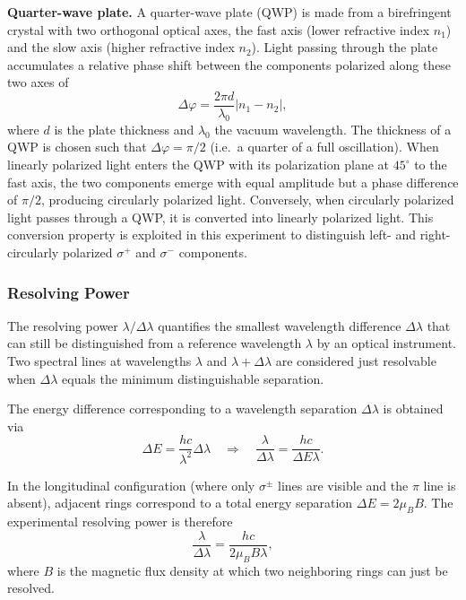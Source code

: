 \documentclass{article}
\begin{document}
\textbf{Quarter-wave plate.} A quarter-wave plate (QWP) is made from a birefringent crystal with two orthogonal optical axes, the fast axis (lower refractive index $n_1$) and the slow axis (higher refractive index $n_2$). Light passing through the plate accumulates a relative phase shift between the components polarized along these two axes of
\begin{equation}
    \Delta\varphi = \frac{2\pi d}{\lambda_0}|n_1 - n_2|,
\end{equation}
where $d$ is the plate thickness and $\lambda_0$ the vacuum wavelength. The thickness of a QWP is chosen such that $\Delta\varphi = \pi/2$ (i.e.\ a quarter of a full oscillation). When linearly polarized light enters the QWP with its polarization plane at $45^\circ$ to the fast axis, the two components emerge with equal amplitude but a phase difference of $\pi/2$, producing circularly polarized light. Conversely, when circularly polarized light passes through a QWP, it is converted into linearly polarized light. This conversion property is exploited in this experiment to distinguish left- and right-circularly polarized $\sigma^+$ and $\sigma^-$ components.

\subsubsection{Resolving Power}

The resolving power $\lambda/\Delta\lambda$ quantifies the smallest wavelength difference $\Delta\lambda$ that can still be distinguished from a reference wavelength $\lambda$ by an optical instrument. Two spectral lines at wavelengths $\lambda$ and $\lambda + \Delta\lambda$ are considered just resolvable when $\Delta\lambda$ equals the minimum distinguishable separation.

The energy difference corresponding to a wavelength separation $\Delta\lambda$ is obtained via
\begin{equation}
    \Delta E = \frac{hc}{\lambda^2}\Delta\lambda \quad \Rightarrow \quad \frac{\lambda}{\Delta\lambda} = \frac{hc}{\Delta E\lambda}.
    \label{eq:resolving_general}
\end{equation}

In the longitudinal configuration (where only $\sigma^\pm$ lines are visible and the $\pi$ line is absent), adjacent rings correspond to a total energy separation $\Delta E = 2\mu_B B$. The experimental resolving power is therefore
\begin{equation}
    \frac{\lambda}{\Delta\lambda} = \frac{hc}{2\mu_B B\lambda},
    \label{eq:resolving_exp}
\end{equation}
where $B$ is the magnetic flux density at which two neighboring rings can just be resolved.
\end{document}
